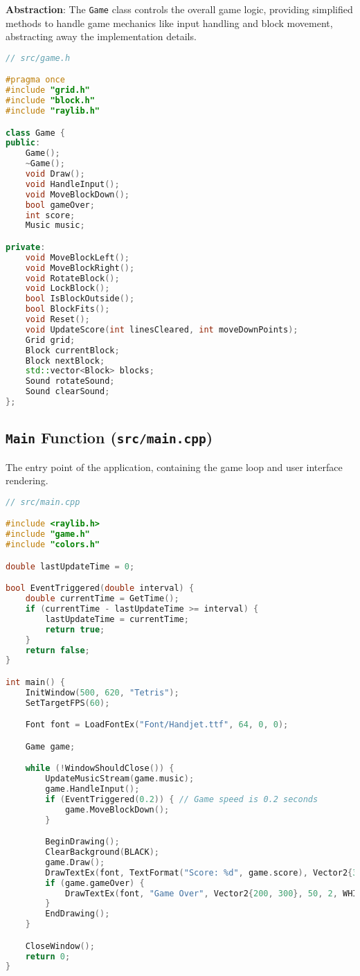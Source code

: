 \documentclass{article}
\begin{document}
\textbf{Abstraction}: The \texttt{Game} class controls the overall game logic, providing simplified methods to handle game mechanics like input handling and block movement, abstracting away the implementation details.

\begin{lstlisting}[language=C++]
// src/game.h

#pragma once
#include "grid.h"
#include "block.h"
#include "raylib.h"

class Game {
public:
    Game();
    ~Game();
    void Draw();
    void HandleInput();
    void MoveBlockDown();
    bool gameOver;
    int score;
    Music music;

private:
    void MoveBlockLeft();
    void MoveBlockRight();
    void RotateBlock();
    void LockBlock();
    bool IsBlockOutside();
    bool BlockFits();
    void Reset();
    void UpdateScore(int linesCleared, int moveDownPoints);
    Grid grid;
    Block currentBlock;
    Block nextBlock;
    std::vector<Block> blocks;
    Sound rotateSound;
    Sound clearSound;
};
\end{lstlisting}

\subsection{\texttt{Main} Function (\texttt{src/main.cpp})}

The entry point of the application, containing the game loop and user interface rendering.

\begin{lstlisting}[language=C++]
// src/main.cpp

#include <raylib.h>
#include "game.h"
#include "colors.h"

double lastUpdateTime = 0;

bool EventTriggered(double interval) {
    double currentTime = GetTime();
    if (currentTime - lastUpdateTime >= interval) {
        lastUpdateTime = currentTime;
        return true;
    }
    return false;
}

int main() {
    InitWindow(500, 620, "Tetris");
    SetTargetFPS(60);

    Font font = LoadFontEx("Font/Handjet.ttf", 64, 0, 0);

    Game game;

    while (!WindowShouldClose()) {
        UpdateMusicStream(game.music);
        game.HandleInput();
        if (EventTriggered(0.2)) { // Game speed is 0.2 seconds
            game.MoveBlockDown();
        }

        BeginDrawing();
        ClearBackground(BLACK);
        game.Draw();
        DrawTextEx(font, TextFormat("Score: %d", game.score), Vector2{310, 200}, 30, 2, WHITE);
        if (game.gameOver) {
            DrawTextEx(font, "Game Over", Vector2{200, 300}, 50, 2, WHITE);
        }
        EndDrawing();
    }

    CloseWindow();
    return 0;
}
\end{lstlisting}
\end{document}
